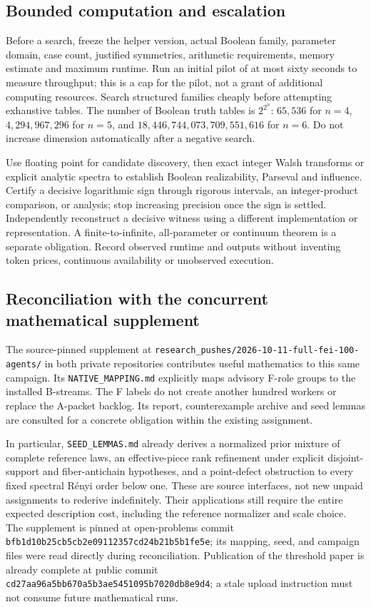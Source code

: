\documentclass[11pt]{article}
\begin{document}
\subsection{Bounded computation and escalation}

Before a search, freeze the helper version, actual Boolean family, parameter domain, case count, justified symmetries, arithmetic requirements, memory estimate and maximum runtime. Run an initial pilot of at most sixty seconds to measure throughput; this is a cap for the pilot, not a grant of additional computing resources. Search structured families cheaply before attempting exhaustive tables. The number of Boolean truth tables is $2^{2^n}$: $65{,}536$ for $n=4$, $4{,}294{,}967{,}296$ for $n=5$, and $18{,}446{,}744{,}073{,}709{,}551{,}616$ for $n=6$. Do not increase dimension automatically after a negative search.

Use floating point for candidate discovery, then exact integer Walsh transforms or explicit analytic spectra to establish Boolean realizability, Parseval and influence. Certify a decisive logarithmic sign through rigorous intervals, an integer-product comparison, or analysis; stop increasing precision once the sign is settled. Independently reconstruct a decisive witness using a different implementation or representation. A finite-to-infinite, all-parameter or continuum theorem is a separate obligation. Record observed runtime and outputs without inventing token prices, continuous availability or unobserved execution.

\subsection{Reconciliation with the concurrent mathematical supplement}

The source-pinned supplement at \texttt{research\_pushes/2026-10-11-full-fei-100-agents/} in both private repositories contributes useful mathematics to this same campaign. Its \texttt{NATIVE\_MAPPING.md} explicitly maps advisory F-role groups to the installed B-streams. The F labels do not create another hundred workers or replace the A-packet backlog. Its report, counterexample archive and seed lemmas are consulted for a concrete obligation within the existing assignment.

In particular, \texttt{SEED\_LEMMAS.md} already derives a normalized prior mixture of complete reference laws, an effective-piece rank refinement under explicit disjoint-support and fiber-antichain hypotheses, and a point-defect obstruction to every fixed spectral R\'enyi order below one. These are source interfaces, not new unpaid assignments to rederive indefinitely. Their applications still require the entire expected description cost, including the reference normalizer and scale choice. The supplement is pinned at open-problems commit \texttt{bfb1d10b25cb5cb2e09112357cd24b21b5b1fe5e}; its mapping, seed, and campaign files were read directly during reconciliation. Publication of the threshold paper is already complete at public commit \texttt{cd27aa96a5bb670a5b3ae5451095b7020db8e9d4}; a stale upload instruction must not consume future mathematical runs.
\end{document}
